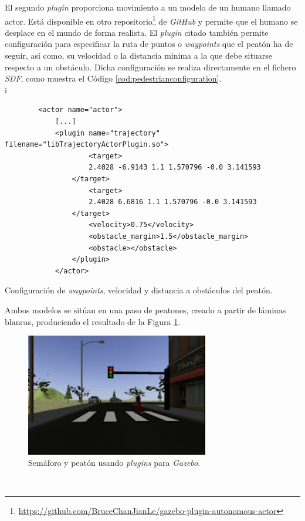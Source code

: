 El segundo \textit{plugin} proporciona movimiento a un modelo de un humano llamado actor. Está disponible en otro
repositorio\footnote{\url{https://github.com/BruceChanJianLe/gazebo-plugin-autonomous-actor}} de \textit{GitHub} y permite que el humano se desplace en el mundo de forma
realista. El \textit{plugin} citado también permite configuración para especificar la ruta de puntos o \textit{waypoints} que el peatón ha de seguir, así como, su velocidad o la
distancia mínima a la que debe situarse respecto a un obstáculo. Dicha configuración se realiza directamente en el fichero \textit{SDF}, como muestra el Código
\ref{cod:pedestrianconfiguration}.\\
i
\begin{code}[h]
	\begin{lstlisting}
		<actor name="actor">
			[...]
			<plugin name="trajectory" filename="libTrajectoryActorPlugin.so">
					<target>
					2.4028 -6.9143 1.1 1.570796 -0.0 3.141593
				</target>
					<target>
					2.4028 6.6816 1.1 1.570796 -0.0 3.141593
				</target>
					<velocity>0.75</velocity>
					<obstacle_margin>1.5</obstacle_margin>
					<obstacle></obstacle>
				</plugin>
			</actor>
	\end{lstlisting}
	\caption[Configuración de \textit{waypoints}, velocidad y distancia a obstáculos del peatón.]{Configuración de \textit{waypoints}, velocidad y distancia a obstáculos del
		peatón.}
	\label{cod:pedestrianconfiguration}
\end{code}

Ambos modelos se sitúan en una paso de peatones, creado a partir de láminas blancas, produciendo el resultado de la Figura \ref{fig:trafficlightpedestrian}.\\

\begin{figure} [h!]
	\begin{center}
		\includegraphics[width=8cm]{figs/trafficlightpedestrian}
	\end{center}
	\caption{Semáforo y peatón usando \textit{plugins} para \textit{Gazebo}.}
	\label{fig:trafficlightpedestrian}
\end{figure}\

